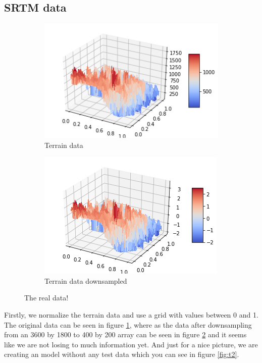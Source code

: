 \documentclass[12pt]{extarticle}
\begin{document}
\subsection{SRTM data}

\begin{figure}
    \centering
    \begin{subfigure}{.5\textwidth}
        \centering
        \includegraphics[width=.95\linewidth]{t1}
        \caption{Terrain data}
        \label{fig:t1sub1}
    \end{subfigure}%
    \begin{subfigure}{.5\textwidth}
        \centering
        \includegraphics[width=.95\linewidth]{t2}
        \caption{Terrain data downsampled}
        \label{fig:t1sub2}
    \end{subfigure}
    \caption{The real data!}
    \label{fig:t1}
\end{figure}

Firstly, we normalize the terrain data and use a grid with values between 0 and 1. The original data can be seen in figure \ref{fig:t1sub1}, where as the data after downsampling from an 3600 by 1800 to 400 by 200 array can be seen in figure \ref{fig:t1sub2} and it seems like we are not losing to much information yet. And just for a nice picture, we are creating an model without any test data which you can see in figure \ref{fig:t2}.
\end{document}
